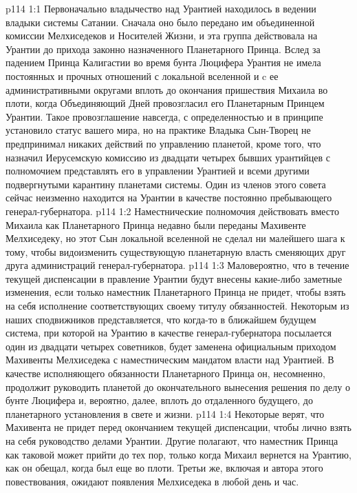 \vs p114 1:1 Первоначально владычество над Урантией находилось в ведении владыки системы Сатании. Сначала оно было передано им объединенной комиссии Мелхиседеков и Носителей Жизни, и эта группа действовала на Урантии до прихода законно назначенного Планетарного Принца. Вслед за падением Принца Калигастии во время бунта Люцифера Урантия не имела постоянных и прочных отношений с локальной вселенной и c ее административными округами вплоть до окончания пришествия Михаила во плоти, когда Объединяющий Дней провозгласил его Планетарным Принцем Урантии. Такое провозглашение навсегда, с определенностью и в принципе установило статус вашего мира, но на практике Владыка Сын\hyp{}Творец не предпринимал никаких действий по управлению планетой, кроме того, что назначил Иерусемскую комиссию из двадцати четырех бывших урантийцев с полномочием представлять его в управлении Урантией и всеми другими подвергнутыми карантину планетами системы. Один из членов этого совета сейчас неизменно находится на Урантии в качестве постоянно пребывающего генерал\hyp{}губернатора.
\vs p114 1:2 Наместнические полномочия действовать вместо Михаила как Планетарного Принца недавно были переданы Махивенте Мелхиседеку, но этот Сын локальной вселенной не сделал ни малейшего шага к тому, чтобы видоизменить существующую планетарную власть сменяющих друг друга администраций генерал\hyp{}губернатора.
\vs p114 1:3 Маловероятно, что в течение текущей диспенсации в правление Урантии будут внесены какие\hyp{}либо заметные изменения, если только наместник Планетарного Принца не придет, чтобы взять на себя исполнение соответствующих своему титулу обязанностей. Некоторым из наших сподвижников представляется, что когда\hyp{}то в ближайшем будущем система, при которой на Урантию в качестве генерал\hyp{}губернатора посылается один из двадцати четырех советников, будет заменена официальным приходом Махивенты Мелхиседека с наместническим мандатом власти над Урантией. В качестве исполняющего обязанности Планетарного Принца он, несомненно, продолжит руководить планетой до окончательного вынесения решения по делу о бунте Люцифера и, вероятно, далее, вплоть до отдаленного будущего, до планетарного установления в свете и жизни.
\vs p114 1:4 Некоторые верят, что Махивента не придет перед окончанием текущей диспенсации, чтобы лично взять на себя руководство делами Урантии. Другие полагают, что наместник Принца как таковой может прийти до тех пор, только когда Михаил вернется на Урантию, как он обещал, когда был еще во плоти. Третьи же, включая и автора этого повествования, ожидают появления Мелхиседека в любой день и час.
